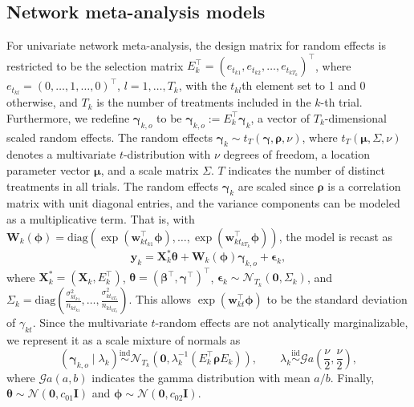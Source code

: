 \subsection{Network meta-analysis models}\label{sec:network-meta}
For univariate network meta-analysis, {\color{black}the design matrix for random effects} is restricted to be the selection matrix $E_k^\top = (e_{t_{k1}}, e_{t_{k2}}, \ldots, e_{t_{k T_k}})^\top$, where $e_{t_{kl}}=(0,\ldots, 1,\ldots,0)^\top$,
$l=1,\ldots,T_k$, with the $t_{kl}$th element set to 1 and 0 otherwise, and $T_k$ is the number of treatments included in the $k$-th trial. Furthermore, we redefine $\boldsymbol{\gamma}_{k,o}$ to be $\boldsymbol{\gamma}_{k,o}:= E_k^\top \boldsymbol{\gamma}_k$, a vector of $T_k$-dimensional scaled random effects. The random effects $\boldsymbol{\gamma}_k \sim t_T(\boldsymbol{\gamma},\boldsymbol{\rho},\nu)$, where $t_T(\boldsymbol{\mu},\Sigma,\nu)$ denotes a multivariate $t$-distribution with $\nu$ degrees of freedom, a location parameter vector $\boldsymbol{\mu}$, and a scale matrix $\Sigma$. $T$ indicates the number of distinct treatments in all trials. The random effects $\boldsymbol{\gamma}_k$ are scaled since $\boldsymbol{\rho}$ is a correlation matrix with unit diagonal entries, and the variance components can be modeled as a multiplicative term. That is, with $\bm{W}_k(\bm{\phi}) = \mathrm{diag}(\exp(\bm{w}_{kt_{k1}}^\top \bm{\phi}), \ldots, \exp(\bm{w}_{kt_{k T_{k}}}^\top \bm{\phi}))$, the model is recast as
\[
  \bm{y}_{k} = \bm{X}_k^*\bm{\theta} + \bm{W}_k(\bm{\phi})\bm{\gamma}_{k,o} + \bm{\epsilon}_k,
\]
where $\bm{X}_k^* = (\bm{X}_k, E_k^\top)$, $\bm{\theta} = (\bm{\beta}^\top, \bm{\gamma}^\top)^\top$, $\bm{\epsilon}_k \sim
\mathcal{N}_{T_k}(\bm{0},\Sigma_k)$, and $\Sigma_k = \mathrm{diag}\left(\frac{\sigma_{kt_{k1}}^2}{n_{kt_{k1}}}, \ldots, \frac{\sigma_{kt_{k T_{k}}}^2}{n_{kt_{k
T_{k}}}}\right)$. This allows $\exp(\boldsymbol{w}_{kt}^\top \boldsymbol{\phi})$ to be the standard deviation of $\gamma_{kt}$. Since the multivariate $t$-random effects are not analytically marginalizable, we represent it as a scale mixture of normals as
\begin{equation}\label{eq:nma-hierarchical-re}
  (\bm{\gamma}_{k,o}\mid \lambda_k) \overset{\text{ind}}{\sim}\mathcal{N}_{T_k}
  \left(\bm{0},\lambda_k^{-1}(E_k^\top \bm{\rho}E_k) \right),\qquad \lambda_k \overset{\text{iid}}{\sim}\mathcal{G}a\left(\frac{\nu}{2},\frac{\nu}{2} \right),
\end{equation}
where $\mathcal{G}a(a,b)$ indicates the gamma distribution with mean $a/b$. Finally, $\boldsymbol{\theta} \sim \mathcal{N}(\boldsymbol{0},c_{01}\boldsymbol{I})$ and $\boldsymbol{\phi} \sim \mathcal{N}(\boldsymbol{0},c_{02}\boldsymbol{I})$.


